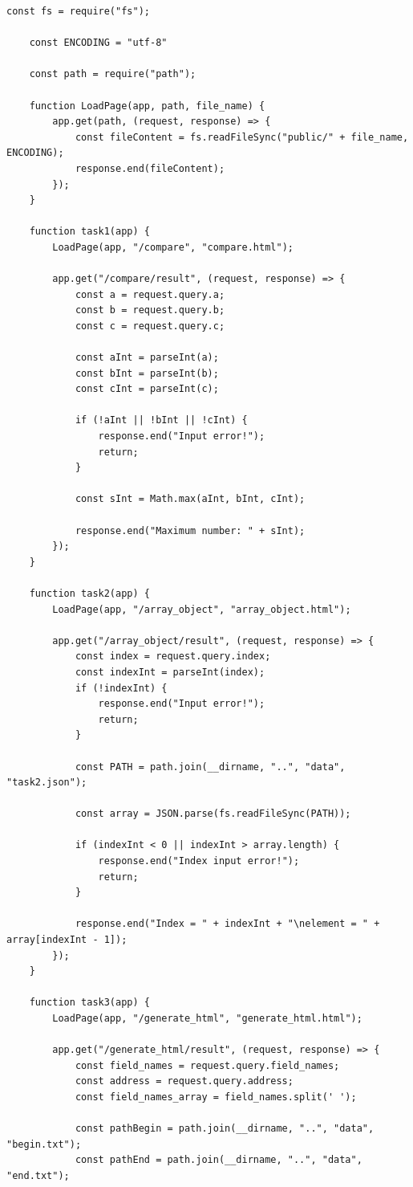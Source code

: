 \begin{lstlisting}[caption=Код программы. TASK\_2. Реализация заданий]
	const fs = require("fs");

	const ENCODING = "utf-8"
	
	const path = require("path");
	
	function LoadPage(app, path, file_name) {
		app.get(path, (request, response) => {
			const fileContent = fs.readFileSync("public/" + file_name, ENCODING);
			response.end(fileContent);
		});
	}
	
	function task1(app) {
		LoadPage(app, "/compare", "compare.html");
	
		app.get("/compare/result", (request, response) => {
			const a = request.query.a;
			const b = request.query.b;
			const c = request.query.c;
	
			const aInt = parseInt(a);
			const bInt = parseInt(b);
			const cInt = parseInt(c);
	
			if (!aInt || !bInt || !cInt) {
				response.end("Input error!");
				return;
			}
	
			const sInt = Math.max(aInt, bInt, cInt);
	
			response.end("Maximum number: " + sInt);
		});
	}
	
	function task2(app) {
		LoadPage(app, "/array_object", "array_object.html");
	
		app.get("/array_object/result", (request, response) => {
			const index = request.query.index;
			const indexInt = parseInt(index);
			if (!indexInt) {
				response.end("Input error!");
				return;
			}
	
			const PATH = path.join(__dirname, "..", "data", "task2.json");
	
			const array = JSON.parse(fs.readFileSync(PATH));
	
			if (indexInt < 0 || indexInt > array.length) {
				response.end("Index input error!");
				return;
			}
	
			response.end("Index = " + indexInt + "\nelement = " + array[indexInt - 1]);
		});
	}
	
	function task3(app) {
		LoadPage(app, "/generate_html", "generate_html.html");
	
		app.get("/generate_html/result", (request, response) => {
			const field_names = request.query.field_names;
			const address = request.query.address;
			const field_names_array = field_names.split(' ');
	
			const pathBegin = path.join(__dirname, "..", "data", "begin.txt");
			const pathEnd = path.join(__dirname, "..", "data", "end.txt");
	

\end{lstlisting}

